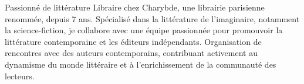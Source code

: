 

\begin{cvskills}

\cvskill
{Passionné de littérature} %
{Libraire chez Charybde, une librairie parisienne renommée, depuis 7 ans. Spécialisé dans la littérature de l'imaginaire, notamment la science-fiction, je collabore avec une équipe passionnée pour promouvoir la littérature contemporaine et les éditeurs indépendants. Organisation de rencontres avec des auteurs contemporains, contribuant activement au dynamisme du monde littéraire et à l'enrichissement de la communauté des lecteurs.} %


\end{cvskills}
